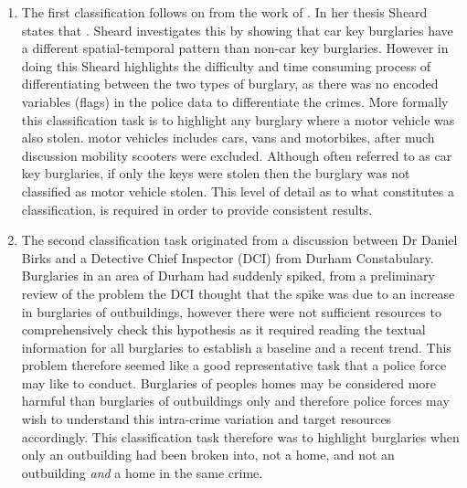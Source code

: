 \begin{enumerate}
   
\item The first classification follows on from the work of \parencite{sheard2020developing}. In her thesis Sheard states that . Sheard investigates this by showing that car key burglaries have a different spatial-temporal pattern than non-car key burglaries. However in doing this Sheard highlights the difficulty and time consuming process of differentiating between the two types of burglary, as there was no encoded variables (flags) in the police data to differentiate the crimes. More formally this classification task is to highlight any burglary where a motor vehicle was also stolen. motor vehicles includes cars, vans and motorbikes, after much discussion mobility scooters were excluded. Although often referred to as car key burglaries, if only the keys were stolen then the burglary was not classified as motor vehicle stolen. This level of detail as to what constitutes a classification, is required in order to provide consistent results. 

 \item The second classification task originated from a discussion between Dr Daniel Birks and a Detective Chief Inspector (DCI) from Durham Constabulary. Burglaries in an area of Durham had suddenly spiked, from a preliminary review of the problem the DCI thought that the spike was due to an increase in burglaries of outbuildings, however there were not sufficient resources to comprehensively check this hypothesis as it required reading the textual information for all burglaries to establish a baseline and a recent trend. This problem therefore seemed like a good representative task that a police force may like to conduct. Burglaries of peoples homes may be considered more harmful than burglaries of outbuildings only and therefore police forces may wish to understand this intra-crime variation and target resources accordingly.  This classification task therefore was to highlight burglaries when only an outbuilding had been broken into, not a home, and not an outbuilding \emph{and} a home in the same crime.  



\end{enumerate}

